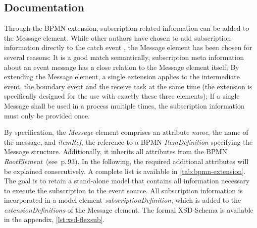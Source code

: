 \subsection{Documentation}

Through the BPMN extension, subscription-related information can be added to the Message element.
While other authors have chosen to add subscription information directly to the catch event \cite{Baumgrass2016,beyer2016unicorn}, the Message element has been chosen for several reasons: It is a good match semantically, subscription meta information about an event message has a close relation to the Message element itself; By extending the Message element, a single extension applies to the intermediate event, the boundary event and the receive task at the same time (the extension is specifically designed for the use with exactly these three elements); If a single Message shall be used in a process multiple times, the subscription information must only be provided once.

By specification, the \textit{Message} element comprises an attribute \textit{name}, the name of the message, and \textit{itemRef}, the reference to a BPMN \textit{ItemDefinition} specifying the Message structure. Additionally, it inherits all attributes from the BPMN \textit{RootElement}~(see \cite{bpmnspec}\,p.\,93).
In the following, the required additional attributes will be explained consecutively. A complete list is available in \autoref{tab:bpmn-extension}. The goal is to retain a stand-alone model that contains all information necessary to execute the subscription to the event source.
All subscription information is incorporated in a model element \textit{subscriptionDefinition}, which is added to the \textit{extensionDefinitions} of the Message element.
The formal XSD-Schema is available in the appendix, \autoref{lst:xsd-flexsub}.

